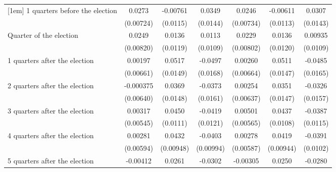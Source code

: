 \begin{table}[htbp]
\begin{tabular}{l*{6}{c}}
[1em]
 1 quarters before the election&      0.0273\sym{***}&    -0.00761         &      0.0349\sym{*}  &      0.0246\sym{***}&    -0.00611         &      0.0307\sym{*}  \\
                    &   (0.00724)         &    (0.0115)         &    (0.0144)         &   (0.00734)         &    (0.0113)         &    (0.0143)         \\
[1em]
Quarter of the election&      0.0249\sym{**} &      0.0136         &      0.0113         &      0.0229\sym{**} &      0.0136         &     0.00935         \\
                    &   (0.00820)         &    (0.0119)         &    (0.0109)         &   (0.00802)         &    (0.0120)         &    (0.0109)         \\
[1em]
 1 quarters after the election&     0.00197         &      0.0517\sym{***}&     -0.0497\sym{**} &     0.00260         &      0.0511\sym{***}&     -0.0485\sym{**} \\
                    &   (0.00661)         &    (0.0149)         &    (0.0168)         &   (0.00664)         &    (0.0147)         &    (0.0165)         \\
[1em]
 2 quarters after the election&   -0.000375         &      0.0369\sym{*}  &     -0.0373\sym{*}  &     0.00254         &      0.0351\sym{*}  &     -0.0326\sym{*}  \\
                    &   (0.00640)         &    (0.0148)         &    (0.0161)         &   (0.00637)         &    (0.0147)         &    (0.0157)         \\
[1em]
 3 quarters after the election&     0.00317         &      0.0450\sym{***}&     -0.0419\sym{***}&     0.00501         &      0.0437\sym{***}&     -0.0387\sym{***}\\
                    &   (0.00545)         &    (0.0111)         &    (0.0121)         &   (0.00565)         &    (0.0108)         &    (0.0115)         \\
[1em]
 4 quarters after the election&     0.00281         &      0.0432\sym{***}&     -0.0403\sym{***}&     0.00278         &      0.0419\sym{***}&     -0.0391\sym{***}\\
                    &   (0.00594)         &   (0.00948)         &   (0.00994)         &   (0.00587)         &   (0.00944)         &    (0.0102)         \\
[1em]
 5 quarters after the election&    -0.00412         &      0.0261\sym{*}  &     -0.0302\sym{**} &    -0.00305         &      0.0250\sym{*}  &     -0.0280\sym{**} \\

\end{tabular}
\end{table}
